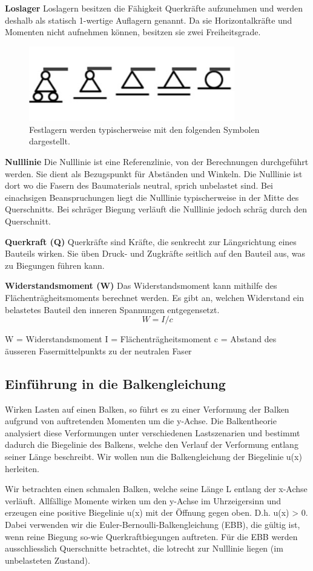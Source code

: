 \textbf{Loslager}
Loslagern besitzen die Fähigkeit Querkräfte aufzunehmen und werden deshalb als statisch 1-wertige Auflagern genannt.
Da sie Horizontalkräfte und Momenten nicht aufnehmen können, besitzen sie zwei Freiheitsgrade.
\begin{figure} [h]
	\centering
	\includegraphics[width=0.8\textwidth]{papers/balken/images/teil1/Loslager.jpg}
	\caption{Festlagern werden typischerweise mit den folgenden Symbolen dargestellt.}
	\label{fig:Festlagern werden typischerweise mit den folgenden Symbolen dargestellt.}
\end{figure}

\textbf{Nulllinie}
Die Nulllinie ist eine Referenzlinie, von der Berechnungen durchgeführt werden. Sie dient als Bezugspunkt für Abständen und Winkeln.
Die Nulllinie ist dort wo die Fasern des Baumaterials neutral, sprich unbelastet sind.
Bei einachsigen Beanspruchungen liegt die Nulllinie typischerweise in der Mitte des Querschnitts.
Bei schräger Biegung verläuft die Nulllinie jedoch schräg durch den Querschnitt.

\textbf{Querkraft (Q)}
Querkräfte sind Kräfte, die senkrecht zur Längsrichtung eines Bauteils wirken.
Sie üben Druck- und Zugkräfte seitlich auf den Bauteil aus, was zu Biegungen führen kann.

\textbf{Widerstandsmoment (W)}
Das Widerstandsmoment kann mithilfe des Flächenträgheitsmoments berechnet werden.
Es gibt an, welchen Widerstand ein belastetes Bauteil den inneren Spannungen entgegensetzt.
\begin{equation}
W=I/c
\end{equation}

W = Widerstandsmoment
I = Flächenträgheitsmoment
c = Abstand des äusseren Fasermittelpunkts zu der neutralen Faser

\subsection{Einführung in die Balkengleichung}
Wirken Lasten auf einen Balken, so führt es zu einer Verformung der Balken aufgrund von auftretenden Momenten um die y-Achse.
Die Balkentheorie analysiert diese Verformungen unter verschiedenen Lastszenarien und bestimmt dadurch die Biegelinie des Balkens, welche den Verlauf der Verformung entlang seiner Länge beschreibt.
Wir wollen nun die Balkengleichung der Biegelinie u(x) herleiten.

Wir betrachten einen schmalen Balken, welche seine Länge L entlang der x-Achse verläuft.
Allfällige Momente wirken um den y-Achse im Uhrzeigersinn und erzeugen eine positive Biegelinie u(x) mit der Öffnung gegen oben.
D.h. u(x) > 0.
Dabei verwenden wir die Euler-Bernoulli-Balkengleichung (EBB), die gültig ist, wenn reine Biegung so-wie Querkraftbiegungen auftreten.
Für die EBB werden ausschliesslich Querschnitte betrachtet, die lotrecht zur Nulllinie liegen (im unbelasteten Zustand).